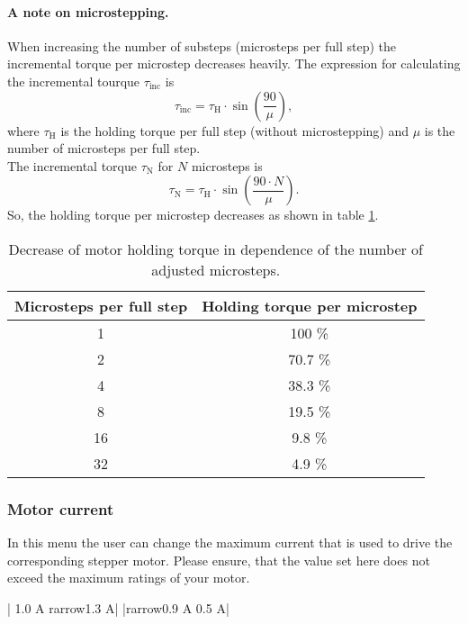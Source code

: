 \paragraph{A note on microstepping.}
When increasing the number of substeps (microsteps per full step) the incremental torque per microstep decreases heavily. The expression for calculating the incremental tourque $\tau_{\text{inc}}$ is
\begin{equation*}
  \tau_{\text{inc}} = \tau_{\text{H}} \cdot \sin \left( \frac{90}{\mu} \right),
\end{equation*}
where $\tau_{\text{H}}$ is the holding torque per full step (without microstepping) and $\mu$ is the number of microsteps per full step.\\
The incremental torque $\tau_{\text{N}}$ for $N$ microsteps is
\begin{equation*}
  \tau_{\text{N}} = \tau_{\text{H}} \cdot \sin \left( \frac{90\cdot N}{\mu} \right).
\end{equation*}
So, the holding torque per microstep decreases as shown in table \ref{tab:microstepping_holding_torque}.
\begin{table}
  \centering
  \begin{tabular}{cc}
    \toprule
    \textbf{Microsteps per full step} & \textbf{Holding torque per microstep} \\
    \toprule
    1 & 100 \% \\ \midrule
    2 & 70.7 \%\\ \midrule
    4 & 38.3 \% \\ \midrule
    8 & 19.5 \% \\ \midrule
    16 & 9.8 \% \\ \midrule
    32 & 4.9 \% \\
    \bottomrule
  \end{tabular}
  \caption{Decrease of motor holding torque in dependence of the number of adjusted microsteps.}
  \label{tab:microstepping_holding_torque}
\end{table}

\subsubsection{Motor current}
\label{menu_motor_current}
In this menu the user can change the maximum current that is used to drive the corresponding stepper motor. Please ensure, that the value set here does not exceed the maximum ratings of your motor. 
\begin{center}
  | 1.0 A  {rarrow}1.3 A|
             |{rarrow}0.9 A   0.5 A|
\end{center}

